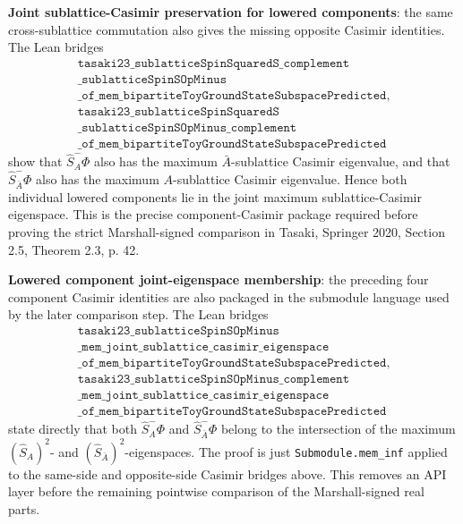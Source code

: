 \documentclass[a4paper,11pt]{article}
\begin{document}
\textbf{Joint sublattice-Casimir preservation for lowered components}:
the same cross-sublattice commutation also gives the missing opposite
Casimir identities.  The Lean bridges
\[
\begin{gathered}
\texttt{tasaki23\_sublatticeSpinSquaredS\_complement}\\
\texttt{\_sublatticeSpinSOpMinus}\\
\texttt{\_of\_mem\_bipartiteToyGroundStateSubspacePredicted},\\
\texttt{tasaki23\_sublatticeSpinSquaredS}\\
\texttt{\_sublatticeSpinSOpMinus\_complement}\\
\texttt{\_of\_mem\_bipartiteToyGroundStateSubspacePredicted}
\end{gathered}
\]
show that \(\hat S_A^-\Phi\) also has the maximum
\(\bar A\)-sublattice Casimir eigenvalue, and that
\(\hat S_{\bar A}^-\Phi\) also has the maximum \(A\)-sublattice Casimir
eigenvalue.  Hence both individual lowered components lie in the joint
maximum sublattice-Casimir eigenspace.  This is the precise
component-Casimir package required before proving the strict
Marshall-signed comparison in Tasaki, Springer 2020, Section 2.5,
Theorem 2.3, p. 42.

\textbf{Lowered component joint-eigenspace membership}: the preceding
four component Casimir identities are also packaged in the submodule
language used by the later comparison step.  The Lean bridges
\[
\begin{gathered}
\texttt{tasaki23\_sublatticeSpinSOpMinus}\\
\texttt{\_mem\_joint\_sublattice\_casimir\_eigenspace}\\
\texttt{\_of\_mem\_bipartiteToyGroundStateSubspacePredicted},\\
\texttt{tasaki23\_sublatticeSpinSOpMinus\_complement}\\
\texttt{\_mem\_joint\_sublattice\_casimir\_eigenspace}\\
\texttt{\_of\_mem\_bipartiteToyGroundStateSubspacePredicted}
\end{gathered}
\]
state directly that both \(\hat S_A^-\Phi\) and
\(\hat S_{\bar A}^-\Phi\) belong to the intersection of the maximum
\((\hat S_A)^2\)- and \((\hat S_{\bar A})^2\)-eigenspaces.  The proof is
just \texttt{Submodule.mem\_inf} applied to the same-side and opposite-side
Casimir bridges above.  This removes an API layer before the remaining
pointwise comparison of the Marshall-signed real parts.
\end{document}
